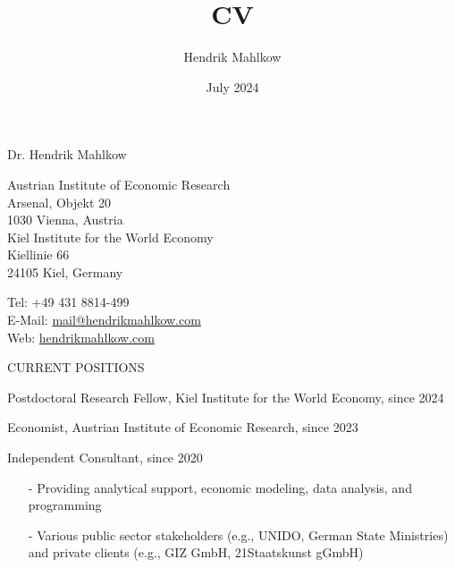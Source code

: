 \documentclass{article}
\title{CV}
\author{Hendrik Mahlkow}
\date{July 2024}
\begin{document}
{\selectfont 
	    \LARGE{Dr. Hendrik Mahlkow}
	}\\
\bigskip


\begin{minipage}[t]{0.66\textwidth}
    Austrian Institute of Economic Research \\
    Arsenal, Objekt 20 \\
    1030 Vienna, Austria \\
    \newline
    Kiel Institute for the World Economy \\
    Kiellinie 66 \\
    24105 Kiel, Germany
\end{minipage}
\hfill
\begin{minipage}[t]{0.33\textwidth} 
    Tel: +49 431 8814-499 \\
    E-Mail: \href{mailto:mail@hendrikmahlkow.com}{mail@hendrikmahlkow.com} \\
    Web: \href{http://hendrikmahlkow.com}{hendrikmahlkow.com} 
\end{minipage}
\bigskip
\bigskip


\begin{comment}
\begin{minipage}[t]{0.12\textwidth}
    {\fontfamily{phv}\selectfont ACADEMIC POSITION} \\
\end{minipage}
\hspace{5mm}
\begin{minipage}[t]{0.8\textwidth} 
    Researcher, Kiel Institute for the World Economy, since July 2019
\end{minipage}
\medskip
\end{comment}

\begin{minipage}[t]{0.12\textwidth}
    {\selectfont CURRENT POSITIONS} \\
\end{minipage}
\hspace{5mm}
\begin{minipage}[t]{0.8\textwidth} 
    Postdoctoral Research Fellow, Kiel Institute for the World Economy,  since 2024 \par
    Economist, Austrian Institute of Economic Research,  since 2023 \par
    Independent Consultant, since 2020 \par
    \begin{itemize}
        \item[-] Providing analytical support, economic modeling, data analysis, and programming
        \item[-] Various public sector stakeholders (e.g., UNIDO, German State Ministries) and private clients (e.g., GIZ GmbH, 21Staatskunst gGmbH)
    \end{itemize}
\end{minipage}
\medskip
\end{document}
